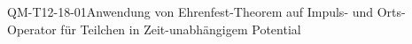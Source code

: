 
\begin{CONC}{QM-T12-18-01}{Anwendung von Ehrenfest-Theorem auf Impuls- und Orts-Operator für Teilchen in Zeit-unabhängigem Potential}
\end{CONC}
